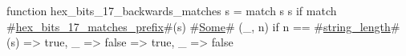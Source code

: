 function hex_bits_17_backwards_matches s = match s {
  s if match #\hyperref[sailRISCVzhexzybitszy17zymatcheszyprefix]{hex\_bits\_17\_matches\_prefix}#(s) {
    #\hyperref[sailRISCVzSome]{Some}# (_, n) if n == #\hyperref[sailRISCVzstringzylength]{string\_length}#(s) => true,
    _ => false
  } => true,
  _ => false
}
